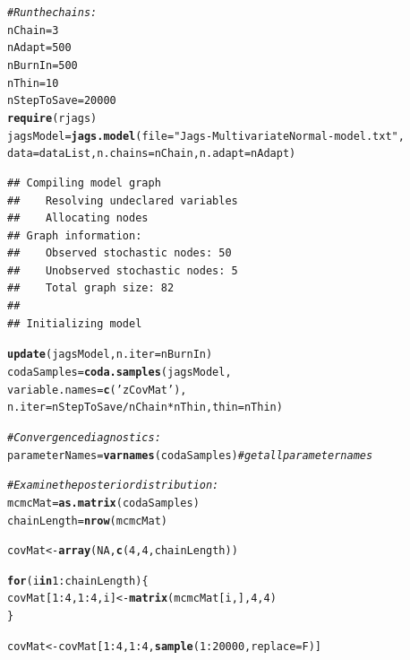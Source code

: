 \documentclass[11pt,a4paper,twoside]{book}\usepackage[]{graphicx}\usepackage[]{color}
\makeatletter
\newcommand{\hlnum}[1]{\textcolor[rgb]{0.686,0.059,0.569}{#1}}%
\newcommand{\hlstr}[1]{\textcolor[rgb]{0.192,0.494,0.8}{#1}}%
\newcommand{\hlcom}[1]{\textcolor[rgb]{0.678,0.584,0.686}{\textit{#1}}}%
\newcommand{\hlopt}[1]{\textcolor[rgb]{0,0,0}{#1}}%
\newcommand{\hlstd}[1]{\textcolor[rgb]{0.345,0.345,0.345}{#1}}%
\newcommand{\hlkwa}[1]{\textcolor[rgb]{0.161,0.373,0.58}{\textbf{#1}}}%
\newcommand{\hlkwb}[1]{\textcolor[rgb]{0.69,0.353,0.396}{#1}}%
\newcommand{\hlkwc}[1]{\textcolor[rgb]{0.333,0.667,0.333}{#1}}%
\newcommand{\hlkwd}[1]{\textcolor[rgb]{0.737,0.353,0.396}{\textbf{#1}}}%
\newenvironment{kframe}{%
 \def\at@end@of@kframe{}%
 \ifinner\ifhmode%
  \def\at@end@of@kframe{\end{minipage}}%
  \begin{minipage}{\columnwidth}%
 \fi\fi%
 \def\FrameCommand##1{\hskip\@totalleftmargin \hskip-\fboxsep
 \colorbox{shadecolor}{##1}\hskip-\fboxsep
     \hskip-\linewidth \hskip-\@totalleftmargin \hskip\columnwidth}%
 \MakeFramed {\advance\hsize-\width
   \@totalleftmargin\z@ \linewidth\hsize
   \@setminipage}}%
 {\par\unskip\endMakeFramed%
 \at@end@of@kframe}
\newenvironment{knitrout}{}{} %
\makeatother
\begin{document}
\begin{knitrout}
\begin{kframe}
\begin{alltt}
\hlcom{# Run the chains:}
\hlstd{nChain} \hlkwb{=} \hlnum{3}
\hlstd{nAdapt} \hlkwb{=} \hlnum{500}
\hlstd{nBurnIn} \hlkwb{=} \hlnum{500}
\hlstd{nThin} \hlkwb{=} \hlnum{10}
\hlstd{nStepToSave} \hlkwb{=} \hlnum{20000}
\hlkwd{require}\hlstd{(rjags)}
\hlstd{jagsModel} \hlkwb{=} \hlkwd{jags.model}\hlstd{(} \hlkwc{file}\hlstd{=}\hlstr{"Jags-MultivariateNormal-model.txt"} \hlstd{,}
                                                                                                \hlkwc{data}\hlstd{=dataList ,} \hlkwc{n.chains}\hlstd{=nChain ,} \hlkwc{n.adapt}\hlstd{=nAdapt )}
\end{alltt}
\begin{verbatim}
## Compiling model graph
##    Resolving undeclared variables
##    Allocating nodes
## Graph information:
##    Observed stochastic nodes: 50
##    Unobserved stochastic nodes: 5
##    Total graph size: 82
## 
## Initializing model
\end{verbatim}
\begin{alltt}
\hlkwd{update}\hlstd{( jagsModel ,} \hlkwc{n.iter}\hlstd{=nBurnIn )}
\hlstd{codaSamples} \hlkwb{=} \hlkwd{coda.samples}\hlstd{( jagsModel ,}
                                                                                                                \hlkwc{variable.names}\hlstd{=}\hlkwd{c}\hlstd{(}\hlstr{'zCovMat'}\hlstd{) ,}
                                                                                                                \hlkwc{n.iter}\hlstd{=nStepToSave}\hlopt{/}\hlstd{nChain}\hlopt{*}\hlstd{nThin ,} \hlkwc{thin}\hlstd{=nThin )}


\hlcom{# Convergence diagnostics:}
\hlstd{parameterNames} \hlkwb{=} \hlkwd{varnames}\hlstd{(codaSamples)} \hlcom{# get all parameter names}


\hlcom{# Examine the posterior distribution:}
\hlstd{mcmcMat} \hlkwb{=} \hlkwd{as.matrix}\hlstd{(codaSamples)}
\hlstd{chainLength} \hlkwb{=} \hlkwd{nrow}\hlstd{(mcmcMat)}

\hlstd{covMat} \hlkwb{<-} \hlkwd{array}\hlstd{(}\hlnum{NA}\hlstd{,} \hlkwd{c}\hlstd{(}\hlnum{4}\hlstd{,}\hlnum{4}\hlstd{,chainLength))}

\hlkwa{for} \hlstd{(i} \hlkwa{in} \hlnum{1}\hlopt{:}\hlstd{chainLength)\{}
\hlstd{covMat[}\hlnum{1}\hlopt{:}\hlnum{4}\hlstd{,}\hlnum{1}\hlopt{:}\hlnum{4}\hlstd{,i]}\hlkwb{<-}\hlkwd{matrix}\hlstd{(mcmcMat[i,],} \hlnum{4}\hlstd{,} \hlnum{4}\hlstd{)}
\hlstd{\}}

\hlstd{covMat} \hlkwb{<-} \hlstd{covMat[}\hlnum{1}\hlopt{:}\hlnum{4}\hlstd{,}\hlnum{1}\hlopt{:}\hlnum{4}\hlstd{,}\hlkwd{sample}\hlstd{(}\hlnum{1}\hlopt{:}\hlnum{20000}\hlstd{,} \hlkwc{replace}\hlstd{=F)]}



\end{alltt}
\end{kframe}
\end{knitrout}
\end{document}
